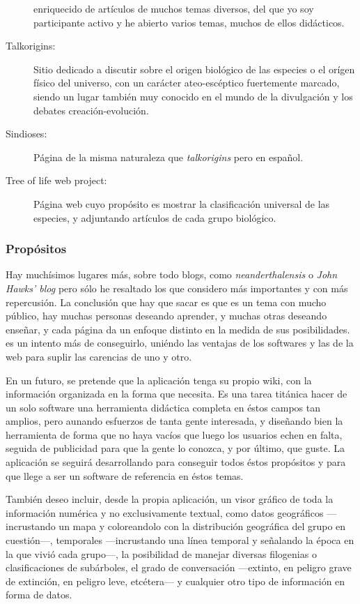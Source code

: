 \begin{description}
  enriquecido de artículos de muchos temas diversos, del que yo soy
  participante activo y he abierto varios temas, muchos de ellos
  didácticos.
\item[Talkorigins:] Sitio dedicado a discutir sobre el origen
  biológico de las especies o el orígen físico del universo, con un
  carácter ateo-escéptico fuertemente marcado, siendo un lugar también
  muy conocido en el mundo de la divulgación y los debates
  creación-evolución.
\item[Sindioses:] Página de la misma naturaleza que
  \textit{talkorigins} pero en español.
\item[Tree of life web project:] Página web cuyo propósito es mostrar
  la clasificación universal de las especies, y adjuntando artículos
  de cada grupo biológico.
\end{description}

\subsubsection{Propósitos}
Hay muchísimos lugares más, sobre todo blogs, como
\textit{neanderthalensis} o \textit{John Hawks' blog} pero sólo he
resaltado los que considero más importantes y con más repercusión. La
conclusión que hay que sacar es que es un tema con mucho público, hay
muchas personas deseando aprender, y muchas otras deseando enseñar, y
cada página da un enfoque distinto en la medida de sus
posibilidades. \fpt es un intento más de conseguirlo, uniéndo las
ventajas de los softwares y las de la web para suplir las carencias de
uno y otro.

En un futuro, se pretende que la aplicación tenga su propio wiki, con
la información organizada en la forma que \fpt necesita. Es una tarea
titánica hacer de un solo software una herramienta didáctica completa
en éstos campos tan amplios, pero aunando esfuerzos de tanta gente
interesada, y diseñando bien la herramienta de forma que no haya
vacíos que luego los usuarios echen en falta, seguida de publicidad
para que la gente lo conozca, y por último, que guste. La aplicación
se seguirá desarrollando para conseguir todos éstos propósitos y para que
\fpt llege a ser un software de referencia en éstos temas.

También deseo incluir, desde la propia aplicación, un visor gráfico de
toda la información numérica y no exclusivamente textual, como datos
geográficos \----incrustando un mapa y coloreandolo con la
distribución geográfica del grupo en cuestión\----, temporales
\----incrustando una línea temporal y señalando la época en la que
vivió cada grupo\----, la posibilidad de manejar diversas filogenias o
clasificaciones de subárboles, el grado de conversación \----extinto,
en peligro grave de extinción, en peligro leve, etcétera\---- y
cualquier otro tipo de información en forma de datos.
